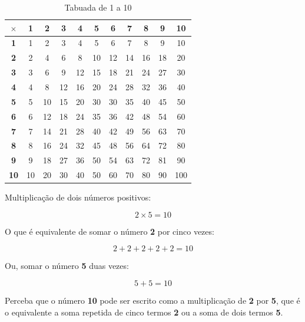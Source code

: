     \begin{table}[H]
        \centering
        \begin{tabular}{|c|c|c|c|c|c|c|c|c|c|c|}
        \hline
            $\times$ & \textbf{1} & \textbf{2} & \textbf{3} & \textbf{4} & \textbf{5} & \textbf{6} & \textbf{7} & \textbf{8} & \textbf{9} & \textbf{10}\\  \hline
             \textbf{1} & 1 & 2 & 3 & 4 & 5 & 6 & 7 & 8 & 9 & 10\\ \hline
             \textbf{2} & 2 & 4 & 6 & 8 & 10 & 12 & 14 & 16 & 18 & 20\\ \hline
             \textbf{3} & 3 & 6 & 9 & 12 & 15 & 18 & 21 & 24 & 27 & 30\\ \hline
             \textbf{4} & 4 & 8 & 12 & 16 & 20 & 24 & 28 & 32 & 36 & 40\\ \hline
             \textbf{5} & 5 & 10 & 15 & 20 & 30 & 30 & 35 & 40 & 45 & 50\\ \hline
             \textbf{6} & 6 & 12 & 18 & 24 & 35 & 36 & 42 & 48 & 54 & 60\\ \hline
             \textbf{7} & 7 & 14 & 21 & 28 & 40 & 42 & 49 & 56 & 63 & 70\\ \hline
             \textbf{8} & 8 & 16 & 24 & 32 & 45 & 48 & 56 & 64 & 72 & 80\\ \hline
             \textbf{9} & 9 & 18 & 27 & 36 & 50 & 54 & 63 & 72 & 81 & 90\\ \hline
             \textbf{10} & 10 & 20 & 30 & 40 & 50 & 60 & 70 & 80 & 90 & 100\\
        \hline
        \end{tabular}
        \caption{Tabuada de 1 a 10}
        \label{tab:tabuada_1_a_10}
    \end{table}

\begin{exemplo}
    Multiplicação de dois números positivos:

    \begin{equation}
        2 \times 5 = 10
    \end{equation}

    O que é equivalente de somar o número \textbf{2} por cinco vezes:

    \begin{equation}
        2+2+2+2+2 = 10
    \end{equation}

    Ou, somar o número \textbf{5} duas vezes:

    \begin{equation}
        5+5=10
    \end{equation}

    Perceba que o número \textbf{10} pode ser escrito como a multiplicação de \textbf{2} por \textbf{5}, que é o equivalente a soma repetida de cinco termos \textbf{2} ou a soma de dois termos \textbf{5}.
\end{exemplo}

